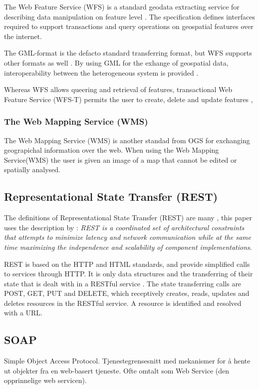 The Web Feature Service (WFS) is a standard geodata extracting service for describing data manipulation on feature level \citep{Peng2005, Norgedigitalt2014}. The specification defines interfaces required to support transactions and query operations on geospatial features over the internet.

The GML-format is the defacto standard transferring format, but WFS supports other formats as well \citep{Eggan2017}. By using GML for the exhange of geospatial data,  interoperability between the heterogeneous system is provided \citep{YaoXiaobai2008Iimo}.

Whereas WFS allows queering and retrieval of features, transactional Web Feature Service (WFS-T) permits the user to create, delete and update features \citep{OGCNetwork},

\subsubsection{The Web Mapping Service (WMS)}
The Web Mapping Service (WMS) is another standad from OGS for exchanging geograpichal information over the web. When using the Web Mapping Service(WMS) the user is given an image of a map that cannot be edited or spatially analysed. 	


\subsection{Representational State Transfer (REST)}
The definitions of Representational State Transfer (REST) are many \citep{Fielding, Richardson}, this paper uses the description by \cite{Fieldinga}: \textit{REST is a coordinated set of architectural constraints that attempts to minimize latency and network communication while at the same time maximizing the independence and scalability of component implementations}. 

REST is based on the HTTP and HTML standards, and provide simplified calls to services through HTTP. It is only data structures and the transferring of their state that is dealt with in a RESTful service \cite{Battle2008}. The state transferring calls are POST, GET, PUT and DELETE, which receptively creates, reads, updates and deletes resources in the RESTful service. A resource is identified and resolved with a URL.



\subsection{SOAP}
Simple Object Access Protocol. Tjenestegrensesnitt med
mekanismer for å hente ut objekter fra en web-basert tjeneste.
Ofte omtalt som Web Service (den opprinnelige web servicen). 

